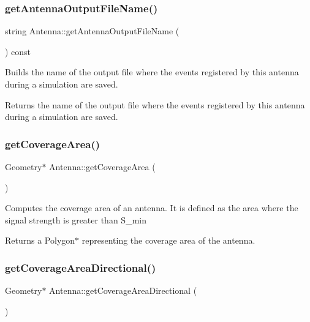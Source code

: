 \subsubsection{\texorpdfstring{get\+Antenna\+Output\+File\+Name()}{getAntennaOutputFileName()}}
{\footnotesize\ttfamily string Antenna\+::get\+Antenna\+Output\+File\+Name (\begin{DoxyParamCaption}{ }\end{DoxyParamCaption}) const}

Builds the name of the output file where the events registered by this antenna during a simulation are saved. \begin{DoxyReturn}{Returns}
the name of the output file where the events registered by this antenna during a simulation are saved. 
\end{DoxyReturn}
\mbox{\label{class_antenna_a5f94dd903add1b59957514887388bd52}} 
\subsubsection{\texorpdfstring{get\+Coverage\+Area()}{getCoverageArea()}}
{\footnotesize\ttfamily Geometry$\ast$ Antenna\+::get\+Coverage\+Area (\begin{DoxyParamCaption}{ }\end{DoxyParamCaption})}

Computes the coverage area of an antenna. It is defined as the area where the signal strength is greater than S\+\_\+min \begin{DoxyReturn}{Returns}
a Polygon$\ast$ representing the coverage area of the antenna. 
\end{DoxyReturn}
\mbox{\label{class_antenna_af5e3d353fcc340b963181514b55bf715}} 
\subsubsection{\texorpdfstring{get\+Coverage\+Area\+Directional()}{getCoverageAreaDirectional()}}
{\footnotesize\ttfamily Geometry$\ast$ Antenna\+::get\+Coverage\+Area\+Directional (\begin{DoxyParamCaption}{ }\end{DoxyParamCaption})\hspace{0.3cm}{\ttfamily [private]}}

